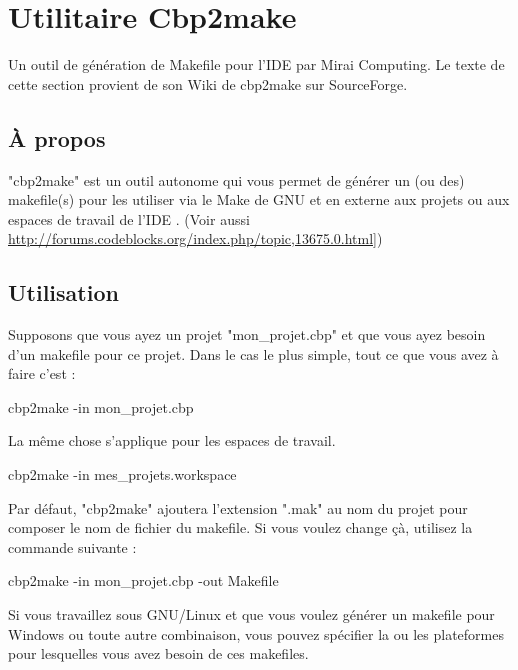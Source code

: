 ﻿\section{Utilitaire Cbp2make}\label{sec:cbp2make}

Un outil de génération de Makefile pour l'IDE \codeblocks par Mirai Computing. Le texte de cette section provient de son Wiki de cbp2make sur SourceForge.

\subsection{À propos}

"cbp2make" est un outil autonome qui vous permet de générer un (ou des) makefile(s) pour les utiliser via le Make de GNU et en externe aux projets ou aux espaces de travail de l'IDE \codeblocks. (Voir aussi \url{http://forums.codeblocks.org/index.php/topic,13675.0.html]})

\subsection{Utilisation}

Supposons que vous ayez un projet "mon\_projet.cbp" et que vous ayez besoin d'un makefile pour ce projet. Dans le cas le plus simple, tout ce que vous avez à faire c'est :
\begin{code}
cbp2make -in mon_projet.cbp
\end{code}

La même chose s'applique pour les espaces de travail.
\begin{code}
cbp2make -in mes_projets.workspace
\end{code}

Par défaut, "cbp2make" ajoutera l'extension ".mak" au nom du projet pour composer le nom de fichier du makefile.
Si vous voulez change çà, utilisez la commande suivante :

\begin{code}
cbp2make -in mon_projet.cbp -out Makefile
\end{code}

Si vous travaillez sous GNU/Linux et que vous voulez générer un makefile pour Windows ou toute autre combinaison, vous pouvez spécifier la ou les plateformes pour lesquelles vous avez besoin de ces makefiles.

